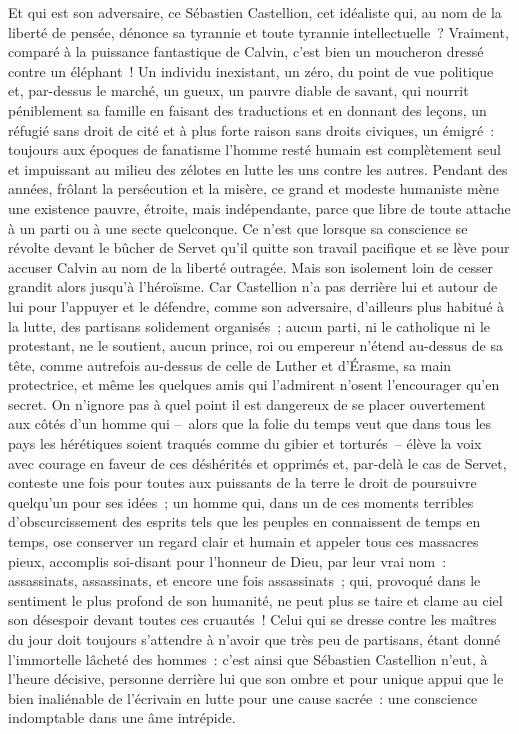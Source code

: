 \documentclass[french,twoside]{book} %
\begin{document}
Et qui est son adversaire, ce Sébastien Castellion, cet idéaliste qui, au nom de la liberté de pensée, dénonce sa tyrannie et toute tyrannie intellectuelle ? Vraiment, comparé à la puissance fantastique de Calvin, c’est bien un moucheron dressé contre un éléphant ! Un individu inexistant, un zéro, du point de vue politique et, par-dessus le marché, un gueux, un pauvre diable de savant, qui nourrit péniblement sa famille en faisant des traductions et en donnant des leçons, un réfugié sans droit de cité et à plus forte raison sans droits civiques, un émigré : toujours aux époques de fanatisme l’homme resté humain est complètement seul et impuissant au milieu des zélotes en lutte les uns contre les autres. Pendant des années, frôlant la persécution et la misère, ce grand et modeste humaniste mène une existence pauvre, étroite, mais indépendante, parce que libre de toute attache à un parti ou à une secte quelconque. Ce n’est que lorsque sa conscience se révolte devant le bûcher de Servet qu’il quitte son travail pacifique et se lève pour accuser Calvin au nom de la liberté outragée. Mais son isolement loin de cesser grandit alors jusqu’à l’héroïsme. Car Castellion n’a pas derrière lui et autour de lui pour l’appuyer et le défendre, comme son adversaire, d’ailleurs plus habitué à la lutte, des partisans solidement organisés ; aucun parti, ni le catholique ni le protestant, ne le soutient, aucun prince, roi ou empereur n’étend au-dessus de sa tête, comme autrefois au-dessus de celle de Luther et d’Érasme, sa main protectrice, et même les quelques amis qui l’admirent n’osent l’encourager qu’en secret. On n’ignore pas à quel point il est dangereux de se placer ouvertement aux côtés d’un homme qui – alors que la folie du temps veut que dans tous les pays les hérétiques soient traqués comme du gibier et torturés – élève la voix avec courage en faveur de ces déshérités et opprimés et, par-delà le cas de Servet, conteste une fois pour toutes aux puissants de la terre le droit de poursuivre quelqu’un pour ses idées ; un homme qui, dans un de ces moments terribles d’obscurcissement des esprits tels que les peuples en connaissent de temps en temps, ose conserver un regard clair et humain et appeler tous ces massacres pieux, accomplis soi-disant pour l’honneur de Dieu, par leur vrai nom : assassinats, assassinats, et encore une fois assassinats ; qui, provoqué dans le sentiment le plus profond de son humanité, ne peut plus se taire et clame au ciel son désespoir devant toutes ces cruautés ! Celui qui se dresse contre les maîtres du jour doit toujours s’attendre à n’avoir que très peu de partisans, étant donné l’immortelle lâcheté des hommes : c’est ainsi que Sébastien Castellion n’eut, à l’heure décisive, personne derrière lui que son ombre et pour unique appui que le bien inaliénable de l’écrivain en lutte pour une cause sacrée : une conscience indomptable dans une âme intrépide.\par
\end{document}
